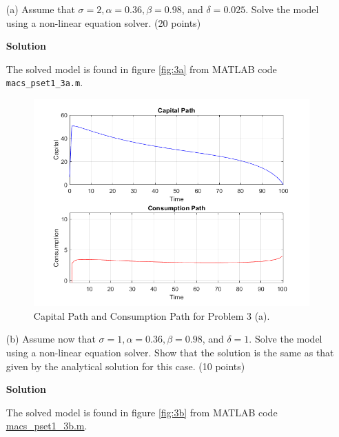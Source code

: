 \documentclass[12pt]{article}
\begin{document}
\begin{enumerate}
    \item[(a)] Assume that \(\sigma = 2, \alpha = 0.36, \beta = 0.98\), and \(\delta = 0.025\). Solve the model using a non-linear equation solver. (20 points)

    \textbf{Solution}

    The solved model is found in figure \eqref{fig:3a} from MATLAB code \verb!macs_pset1_3a.m!.

    \begin{figure}[h!]
    \centering
        \includegraphics[width=\textwidth]{3a.png}
        \caption{Capital Path and Consumption Path for Problem 3 (a).}
        \label{fig:3a}
\end{figure}

    \item[(b)] Assume now that \(\sigma = 1, \alpha = 0.36, \beta = 0.98\), and \(\delta = 1\). Solve the model using a non-linear equation solver. Show that the solution is the same as that given by the analytical solution for this case. (10 points)

    \textbf{Solution}

    The solved model is found in figure \eqref{fig:3b} from MATLAB code  \url{macs_pset1_3b.m}.


\end{enumerate}
\end{document}
